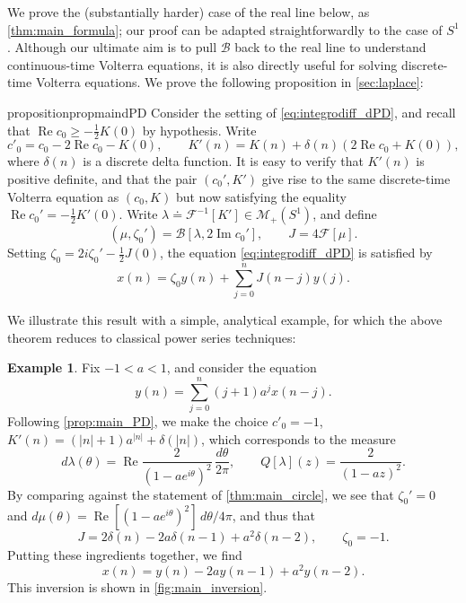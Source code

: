 \documentclass{cams-l} %
\newcommand{\cM}{\mathcal M}
\newcommand{\cB}{\mathcal B}
\newcommand{\cF}{\mathcal F}
\newcommand{\op}{\operatorname}
\renewcommand{\Re}{\op{Re}}
\renewcommand{\Im}{\op{Im}}
\theoremstyle{definition}
\newtheorem{example}[theorem]{Example}
\theoremstyle{remark}
\numberwithin{equation}{section}
\begin{document}
We prove the (substantially harder) case of the real line below, as \cref{thm:main_formula}; our proof can be adapted straightforwardly to the case of $S^1$.
Although our ultimate aim is to pull $\cB$ back to the real line to understand continuous-time Volterra equations, it is also directly useful for solving discrete-time Volterra equations. We prove the following proposition in \cref{sec:laplace}:
\begin{restatable}{proposition}{propmaindPD}\label{prop:main_dPD} Consider the setting of \ref{eq:integrodiff_dPD}, and recall that $\Re c_0 \geq -\tfrac{1}{2}K(0)$ by hypothesis. Write
\[c'_0 = c_0 -2\Re c_0 - K(0),\qquad K'(n) = K(n) + \delta(n)\left(2\Re c_0 + K(0)\right),\]
where $\delta(n)$ is a discrete delta function. It is easy to verify that $K'(n)$ is positive definite, and that the pair $(c_0',K')$ give rise to the same discrete-time Volterra equation as $(c_0,K)$ but now satisfying the equality $\Re c_0' = -\tfrac{1}{2}K'(0)$. Write $\lambda\doteq\cF^{-1}[K']\in\cM_{+}(S^1)$, and define
\[(\mu,\zeta_0')=\cB[\lambda, 2\Im c_0'],\qquad J = 4\cF[\mu].\]
Setting $\zeta_0 = 2i\zeta_0' - \frac{1}{2}J(0)$, the equation \ref{eq:integrodiff_dPD} is satisfied by
    \[x(n) = \zeta_0y(n) + \sum_{j=0}^n J(n-j)y(j).\]
\end{restatable}
We illustrate this result with a simple, analytical example, for which the above theorem reduces to classical power series techniques:
\begin{example}\label{ex:dPD}
    Fix $-1<a<1$, and consider the equation
    \[y(n) = \sum_{j=0}^n (j+1)a^jx(n-j).\]
    Following \cref{prop:main_PD}, we make the choice $c'_0=-1$, $K'(n) = (|n|+1)a^{|n|}+\delta(|n|)$, which corresponds to the measure
    \[d\lambda(\theta) = \Re\frac{2}{(1-ae^{i\theta})^2}\,\frac{d\theta}{2\pi},\qquad Q[\lambda](z) = \frac{2}{(1-az)^2}.\]
    By comparing against the statement of \cref{thm:main_circle}, we see that $\zeta_0'=0$ and $d\mu(\theta) = \Re[(1-ae^{i\theta})^2]\,d\theta/4\pi$, and thus that
    \[J = 2\delta(n) - 2a\delta(n-1) + a^2\delta(n-2),\qquad \zeta_0 = -1.\]
    Putting these ingredients together, we find
    \[x(n) = y(n) - 2ay(n-1) + a^2y(n-2).\]
    This inversion is shown in \cref{fig:main_inversion}.
\end{example}
\end{document}
